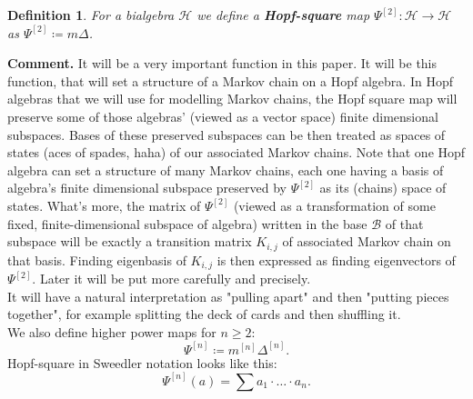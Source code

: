 \documentclass[a4paper, 12pt]{report}
\newtheorem{definition}{Definition}
\begin{document}
\begin{definition}
For a bialgebra $\mathcal{H}$ we define a \textbf{Hopf-square} map
$\Psi^{[2]} : \mathcal{H} \to \mathcal{H}$ as $\Psi^{[2]} \coloneqq m\Delta$.
\end{definition}
\textbf{Comment. } It will be a very important function in this paper. It will be this function, that will
set a structure
of a Markov chain on a Hopf algebra. In Hopf algebras that we will
use for modelling Markov chains, the Hopf square map will preserve some of those algebras'
(viewed as a vector space) finite dimensional subspaces. Bases of these preserved
subspaces can be then treated as spaces of states (aces of spades, haha)
of our associated Markov chains. Note that one Hopf algebra can set a structure of many Markov chains,
each one having a basis of algebra's finite dimensional subspace preserved by $\Psi^{[2]}$ as its (chains)
space of states.
What's more, the matrix of $\Psi^{[2]}$ (viewed as a transformation of some fixed, finite-dimensional
subspace of algebra)
written in the base $\mathcal{B}$ of that subspace will be exactly a transition matrix
$K_{i,j}$ of associated Markov chain on that basis. Finding eigenbasis of $K_{i,j}$ is then expressed as
finding eigenvectors of $\Psi^{[2]}$. Later it will be put more carefully and precisely. \\
It will have a natural interpretation as "pulling apart" and then "putting pieces together", for
example splitting the deck of cards and then shuffling it. \\[4pt]
We also define higher power maps for $n \geq 2$:
\begin{equation*}
\Psi^{[n]} \coloneqq m^{[n]}\Delta^{[n]}.
\end{equation*}
Hopf-square in Sweedler notation looks like this:
\begin{equation*}
\Psi^{[n]}(a) = \sum a_1 \cdot \ldots \cdot a_n.
\end{equation*}
\end{document}
